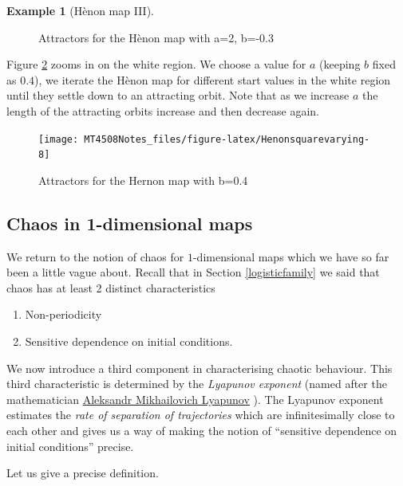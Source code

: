 \documentclass[
  a4paper,
  oneside,
  final]{krantz}
\providecommand{\tightlist}{%
  \setlength{\itemsep}{0pt}\setlength{\parskip}{0pt}}
\theoremstyle{definition}
\theoremstyle{definition}
\newtheorem{example}{Example}[chapter]
\theoremstyle{definition}
\theoremstyle{definition}
\theoremstyle{remark}
\begin{document}
\begin{example}[Hènon map III]
\begin{figure}
{}

\caption{Attractors for the Hènon map with a=2, b=-0.3}\label{fig:henonsquare2}
\end{figure}

Figure \ref{fig:Henonsquarevarying} zooms in on the white region. We choose a value for \(a\) (keeping \(b\) fixed as \(0.4\)), we iterate the Hènon map for different start values in the white region until they settle down to an attracting orbit. Note that as we increase \(a\) the length of the attracting orbits increase and then decrease again.

\begin{figure}

{\centering \texttt{[image: MT4508Notes\_files/figure-latex/Henonsquarevarying-8]} 

}

\caption{Attractors for the Hernon map with b=0.4}\label{fig:Henonsquarevarying}
\end{figure}

\end{example}

\hypertarget{chaos1dim}{%
\subsection{Chaos in 1-dimensional maps}\label{chaos1dim}}

We return to the notion of chaos for \(1\)-dimensional maps which we have so far been a little vague about. Recall that in Section \ref{logisticfamily} we said that chaos has at least 2 distinct characteristics

\begin{enumerate}
\def\labelenumi{\arabic{enumi}.}
\tightlist
\item
  Non-periodicity
\item
  Sensitive dependence on initial conditions.
\end{enumerate}

We now introduce a third component in characterising chaotic behaviour. This third characteristic is determined by the \emph{Lyapunov exponent} (named after the mathematician \href{https://mathshistory.st-andrews.ac.uk/Biographies/Lyapunov}{Aleksandr Mikhailovich Lyapunov} ). The Lyapunov exponent estimates the \emph{rate of separation of trajectories} which are infinitesimally close to each other and gives us a way of making the notion of ``sensitive dependence on initial conditions'' precise.

Let us give a precise definition.
\end{document}
